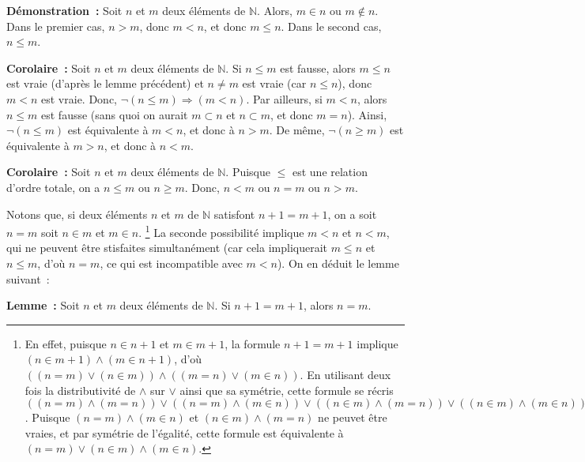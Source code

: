 \medskip

\noindent\textbf{Démonstration :} 
    Soit $n$ et $m$ deux éléments de $\mathbb{N}$. 
    Alors, $m \in n$ ou $m \notin n$. 
    Dans le premier cas, $n > m$, donc $m < n$, et donc $m \leq n$.
    Dans le second cas, $n \leq m$.

   \done 

\medskip

\noindent\textbf{Corolaire :} Soit $n$ et $m$ deux éléments de $\mathbb{N}$. 
    Si $n \leq m$ est fausse, alors $m \leq n$ est vraie (d'après le lemme précédent) et $n \neq m$ est vraie (car $n \leq n$), donc $m < n$ est vraie. 
    Donc, $\neg (n \leq m) \Rightarrow (m < n)$. 
    Par ailleurs, si $m < n$, alors $n \leq m$ est fausse (sans quoi on aurait $m \subset n$ et $n \subset m$, et donc $m = n$).
    Ainsi, $\neg (n \leq m)$ est équivalente à $m < n$, et donc à $n > m$.
    De même, $\neg (n \geq m)$ est équivalente à $m > n$, et donc à $n < m$.

\medskip

\noindent\textbf{Corolaire :} Soit $n$ et $m$ deux éléments de $\mathbb{N}$. 
    Puisque $\leq$ est une relation d'ordre totale, on a $n \leq m$ ou $n \geq m$. 
    Donc, $n < m$ ou $n = m$ ou $n > m$. 

\medskip

Notons que, si deux éléments $n$ et $m$ de $\mathbb{N}$ satisfont $n+1 = m+1$, on a soit $n = m$ soit $n \in m$ et $m \in n$.%
\footnote{
    En effet, puisque $n \in n+1$ et $m \in m+1$, la formule $n+1 = m+1$ implique $(n \in m+1) \wedge (m \in n+1)$, d'où $((n = m) \vee (n \in m)) \wedge ((m = n) \vee (m \in n))$. 
    En utilisant deux fois la distributivité de $\wedge$ sur $\vee$ ainsi que sa symétrie, cette formule se récris $((n = m) \wedge (m = n)) \vee ((n = m) \wedge (m \in n)) \vee ((n \in m) \wedge (m = n)) \vee ((n \in m) \wedge (m \in n))$. 
    Puisque $(n = m) \wedge (m \in n)$ et $(n \in m) \wedge (m = n)$ ne peuvet être vraies, et par symétrie de l'égalité, cette formule est équivalente à $(n = m) \vee (n \in m) \wedge (m \in n)$.
}
La seconde possibilité implique $m < n$ et $n < m$, qui ne peuvent être stisfaites simultanément (car cela impliquerait $m \leq n$ et $n \leq m$, d'où $n = m$, ce qui est incompatible avec $m < n$). 
On en déduit le lemme suivant :

\medskip

\noindent\textbf{Lemme :} 
    Soit $n$ et $m$ deux éléments de $\mathbb{N}$. 
    Si $n+1 = m+1$, alors $n=m$.

